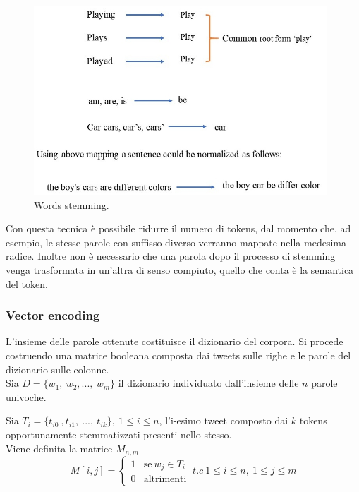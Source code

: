 \documentclass[oneside]{book}
\begin{document}
\begin{figure}[!h]
	\centering
	\includegraphics[width=11cm]{assets/stemming.jpg}

	\caption[Caption for LOF]{Words stemming.\footnotemark}
	\label{fig:stemming}
\end{figure}




Con questa tecnica è possibile ridurre il numero di tokens, dal momento che, ad esempio, le stesse parole con suffisso diverso verranno mappate nella medesima radice. Inoltre non è necessario che una parola dopo il processo di stemming venga trasformata in un'altra di senso compiuto, quello che conta è la semantica del token.


\subsubsection{Vector encoding}

L'insieme delle parole ottenute costituisce il dizionario del corpora. Si procede costruendo una matrice booleana composta dai tweets sulle righe e le parole del dizionario sulle colonne.\\

Sia $D = \{w_1,\ w_2, ...,\ w_m\}$ il dizionario individuato dall'insieme delle $n$ parole univoche.

Sia $T_i = \{t_{i0}\ ,t_{i1},\ ...,\ t_{ik}\}, \ 1 \leq i \leq n$, l'i-esimo tweet composto dai $k$ tokens opportunamente stemmatizzati presenti nello stesso.\\
Viene definita la matrice $M_{n,m}$
\[
M[i,j] =
\begin{cases}
1 & \text{se}\ w_j \in T_i\\
0 & \text{altrimenti}
\end{cases}
\ t.c\ 1\leq i\leq n,\ 1 \leq j \leq m
\]
\end{document}
